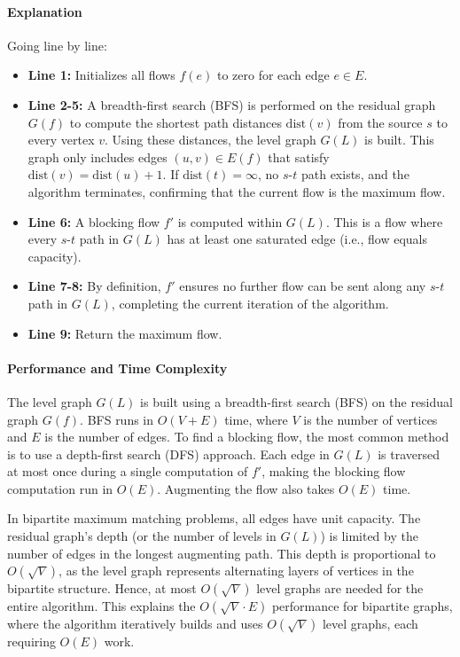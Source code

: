\paragraph{Explanation}

Going line by line:
\begin{itemize}
    \item \textbf{Line 1:} Initializes all flows $f(e)$ to zero for each edge $e \in E$.
    \item \textbf{Line 2-5:} A breadth-first search (BFS) is performed on the residual graph $G(f)$ to compute the shortest path distances $\text{dist}(v)$ from the source $s$ to every vertex $v$. Using these distances, the level graph $G(L)$ is built. This graph only includes edges $(u,v) \in E(f)$ that satisfy $\text{dist}(v)=\text{dist}(u)+1$. If $\text{dist}(t)=\infty$, no $s$-$t$ path exists, and the algorithm terminates, confirming that the current flow is the maximum flow.
    \item \textbf{Line 6:} A blocking flow $f'$ is computed within $G(L)$. This is a flow where every $s$-$t$ path in $G(L)$ has at least one saturated edge (i.e., flow equals capacity).
    \item \textbf{Line 7-8:} By definition, $f'$ ensures no further flow can be sent along any $s$-$t$ path in $G(L)$, completing the current iteration of the algorithm.
    \item \textbf{Line 9:} Return the maximum flow.
\end{itemize}

\paragraph{Performance and Time Complexity}

The level graph $G(L)$ is built using a breadth-first search (BFS) on the residual graph $G(f)$. BFS runs in $O(V + E)$ time, where $V$ is the number of vertices and $E$ is the number of edges. To find a blocking flow, the most common method is to use a depth-first search (DFS) approach. Each edge in $G(L)$ is traversed at most once during a single computation of $f'$, making the blocking flow computation run in $O(E)$. Augmenting the flow also takes $O(E)$ time.

In bipartite maximum matching problems, all edges have unit capacity. The residual graph's depth (or the number of levels in $G(L)$) is limited by the number of edges in the longest augmenting path. This depth is proportional to $O(\sqrt{V})$, as the level graph represents alternating layers of vertices in the bipartite structure. Hence, at most $O(\sqrt{V})$ level graphs are needed for the entire algorithm. This explains the $O(\sqrt{V} \cdot E)$ performance for bipartite graphs, where the algorithm iteratively builds and uses $O(\sqrt{V})$ level graphs, each requiring $O(E)$ work.


